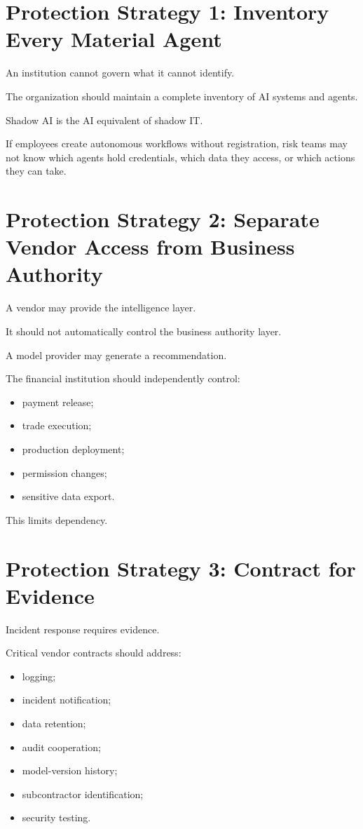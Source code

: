 \section{Protection Strategy 1: Inventory Every Material Agent}

An institution cannot govern what it cannot identify.

The organization should maintain a complete inventory of AI systems and agents.

Shadow AI is the AI equivalent of shadow IT.

If employees create autonomous workflows without registration, risk teams may not know which agents hold credentials, which data they access, or which actions they can take.

\section{Protection Strategy 2: Separate Vendor Access from Business Authority}

A vendor may provide the intelligence layer.

It should not automatically control the business authority layer.

A model provider may generate a recommendation.

The financial institution should independently control:

\begin{itemize}
    \item payment release;
    \item trade execution;
    \item production deployment;
    \item permission changes;
    \item sensitive data export.
\end{itemize}

This limits dependency.

\section{Protection Strategy 3: Contract for Evidence}

Incident response requires evidence.

Critical vendor contracts should address:

\begin{itemize}
    \item logging;
    \item incident notification;
    \item data retention;
    \item audit cooperation;
    \item model-version history;
    \item subcontractor identification;
    \item security testing.
\end{itemize}

